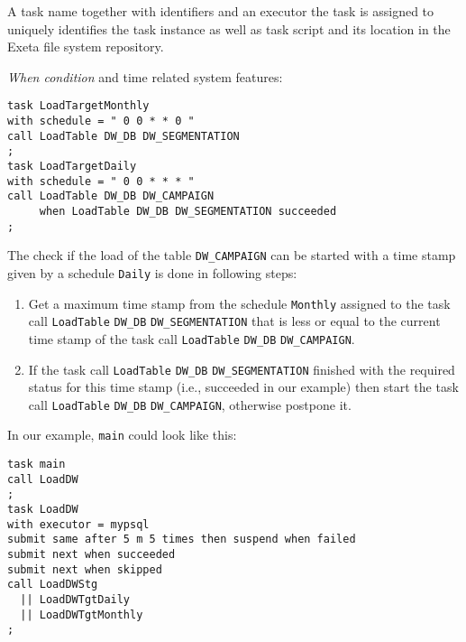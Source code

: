 \documentclass[a4paper,12pt,english,oneside]{book}
\newcommand{\exeta}{Exeta\xspace}
\begin{document}

A task name together with identifiers and an executor the task is assigned to uniquely identifies the task instance as well as task script and its location in the \exeta file system repository.

\emph{When condition} and time related system features:
\begin{verbatim}
task LoadTargetMonthly
with schedule = " 0 0 * * 0 "
call LoadTable DW_DB DW_SEGMENTATION
;
task LoadTargetDaily
with schedule = " 0 0 * * * "
call LoadTable DW_DB DW_CAMPAIGN
     when LoadTable DW_DB DW_SEGMENTATION succeeded
;
\end{verbatim}

The check if the load of the table \verb|DW_CAMPAIGN|
can be started with a time stamp given by a schedule \verb|Daily| is done in following steps:
\begin{enumerate}
\item Get a maximum time stamp from the schedule \verb|Monthly| assigned to the task call
\verb|LoadTable| \verb|DW_DB| \verb|DW_SEGMENTATION|
that is less or equal to the current time stamp of the task call
\verb|LoadTable| \verb|DW_DB| \verb|DW_CAMPAIGN|.
\item If the task call
\verb|LoadTable| \verb|DW_DB| \verb|DW_SEGMENTATION|
finished with the required status for this time stamp (i.e., succeeded in our example) then start the task call
\verb|LoadTable| \verb|DW_DB| \verb|DW_CAMPAIGN|,
otherwise postpone it.
\end{enumerate}

In our example, \verb|main| could look like this:
\begin{verbatim}
task main
call LoadDW
;
task LoadDW
with executor = mypsql
submit same after 5 m 5 times then suspend when failed
submit next when succeeded
submit next when skipped
call LoadDWStg
  || LoadDWTgtDaily
  || LoadDWTgtMonthly
;
\end{verbatim}

\end{document}
